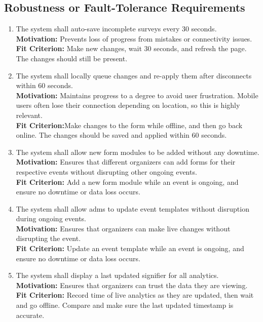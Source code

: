 \documentclass[12pt]{article}
\begin{document}
\subsection{Robustness or Fault-Tolerance Requirements}
\begin{enumerate}[label=\bfseries FT-\arabic*:, wide=0pt, leftmargin=*]
  \item \label{PTFR1} The system shall auto-save incomplete surveys every 30 seconds.\\
  {\bf Motivation:} Prevents loss of progress from mistakes or connectivity issues.\\
  {\bf Fit Criterion:} Make new changes, wait 30 seconds, and refresh the page. The changes should still be present.
  \item \label{PTFR2} The system shall locally queue changes and re-apply them after disconnects within 60 seconds.\\
  {\bf Motivation:} Maintains progress to a degree to avoid user frustration. Mobile users often lose their connection depending on location, so this is highly relevant.\\
  {\bf Fit Criterion:}Make changes to the form while offline, and then go back online. The changes should be saved and applied within 60 seconds.
  \item \label{PTFR3} The system shall allow new form modules to be added without any downtime.\\
  {\bf Motivation:} Ensures that different organizers can add forms for their respective events without disrupting other ongoing events.\\
  {\bf Fit Criterion:} Add a new form module while an event is ongoing, and ensure no downtime or data loss occurs.
  \item \label{PTFR4} The system shall allow \glspl{adm} to update event templates without disruption
    during ongoing events.\\
  {\bf Motivation:} Ensures that organizers can make live changes without disrupting the event.\\
  {\bf Fit Criterion:} Update an event template while an event is ongoing, and ensure no downtime or data loss occurs.
  \item \label{PTFR5} The system shall display a last updated signifier for all analytics.\\
  {\bf Motivation:} Ensures that organizers can trust the data they are viewing.\\
  {\bf Fit Criterion:} Record time of live analytics as they are updated, then wait and go offline. Compare and make sure the last updated timestamp is accurate.
  \end{enumerate}
\end{document}

